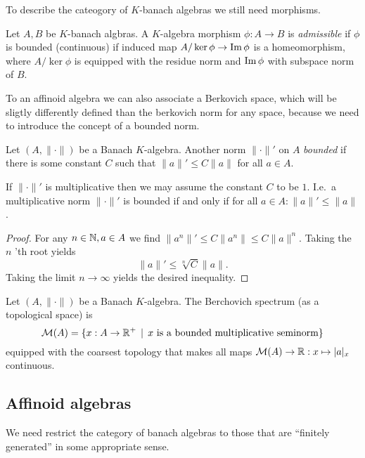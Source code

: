 To describe the cateogory of $K$-banach algebras we still need morphisms.
\begin{definition}
	Let $A, B$ be $K$-banach algbras. 
	A $K$-algebra morphism $\phi: A \to B$ is \emph{admissible} if $\phi$ is bounded (continuous) if induced map $A / \ker \phi \to \operatorname{Im} \phi$ is a homeomorphism, where $A / \ker \phi$ is equipped with the residue norm and $\operatorname{Im} \phi$ with subspace norm of $B$. 
\end{definition}


To an affinoid algebra we can also associate a Berkovich space, which will be sligtly differently defined than the berkovich norm for any space, because we need to introduce the concept of a bounded norm.

\begin{definition}
	Let $(A, \|\cdot \|)$ be a Banach $K$-algebra. Another norm $\|\cdot \|'$ on $A$ \emph{bounded}  if there is some constant $C$ such that  $\|a\|' \le C \|a\|$ for all $a \in A$. 
\end{definition}

\begin{remark}
	If $\|\cdot \|'$ is multiplicative then we may assume the constant $C$ to be $1$. 
	I.e.\ a multiplicative norm $\|\cdot \|'$ is bounded if and only if  for all $a \in A: \|a\|' \le \|a\|$. 
\end{remark}
\begin{proof}
	For any $n \in \mathbb{N}, a \in A$ we find $\|a^{n}\|' \le C \|a^{n}\| \le C \|a\|^{n}$. 
	Taking the $n$ 'th root yields \[
		\|a\|' \le \sqrt[n]{C} \|a\|
	.\] 
	Taking the limit $n \to \infty$ yields the desired inequality. 
\end{proof}

\begin{definition}
	Let $(A, \|\cdot \|)$ be a Banach $K$-algebra. 
	The Berchovich spectrum (as a topological space) is \[
		\mathcal{M} (A) = \{x: A \to\R^{+} \st x \text{ is a bounded multiplicative seminorm}\} 
	\] 
	equipped with the coarsest topology that makes all maps $\mathcal{M} (A) \to \mathbb{R}: x \mapsto |a|_x$ continuous. 

\end{definition}
\subsection{Affinoid algebras} \label{sec:affinoid_algebras}
We need restrict the category of banach algebras to those that are ``finitely generated'' in some appropriate sense. 

